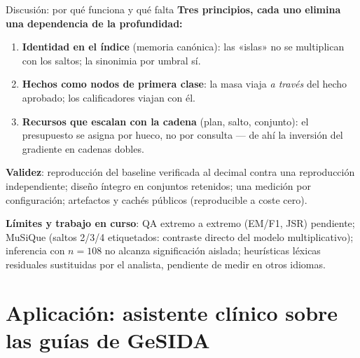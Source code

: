 \documentclass[aspectratio=169,10pt]{beamer}
\begin{document}
\begin{frame}{Discusión: por qué funciona y qué falta}
\textbf{Tres principios, cada uno elimina una dependencia de la profundidad:}
\begin{enumerate}
\item \textbf{Identidad en el índice} (memoria canónica): las «islas» no se
  multiplican con los saltos; la sinonimia por umbral sí.
\item \textbf{Hechos como nodos de primera clase}: la masa viaja \emph{a través}
  del hecho aprobado; los calificadores viajan con él.
\item \textbf{Recursos que escalan con la cadena} (plan, salto, conjunto):
  el presupuesto se asigna por hueco, no por consulta --- de ahí la inversión
  del gradiente en cadenas dobles.
\end{enumerate}
\vspace{1mm}
\textbf{Validez}: reproducción del baseline verificada al decimal contra una
reproducción independiente; diseño íntegro en conjuntos retenidos; una medición
por configuración; artefactos y cachés públicos (reproducible a coste cero).

\textbf{Límites y trabajo en curso}: QA extremo a extremo (EM/F1, JSR) pendiente;
MuSiQue (saltos 2/3/4 etiquetados: contraste directo del modelo multiplicativo);
inferencia con $n{=}108$ no alcanza significación aislada; heurísticas léxicas
residuales sustituidas por el analista, pendiente de medir en otros idiomas.
\end{frame}

\section{Aplicación: asistente clínico sobre las guías de GeSIDA}
\end{document}
